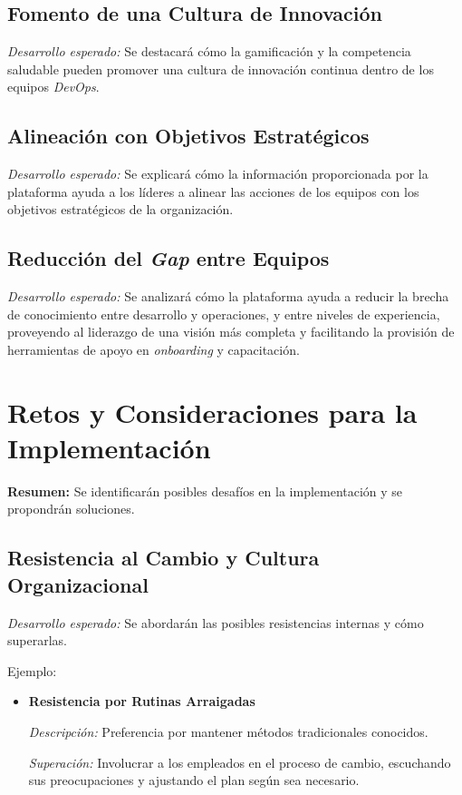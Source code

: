 \documentclass[journal]{IEEEtran}
\begin{document}
\subsection{\textbf{ Fomento de una Cultura de Innovación}}

\textit{Desarrollo esperado:} Se destacará cómo la gamificación y la competencia saludable pueden promover una cultura de innovación continua dentro de los equipos \textit{DevOps}.

\subsection{\textbf{ Alineación con Objetivos Estratégicos}}

\textit{Desarrollo esperado:} Se explicará cómo la información proporcionada por la plataforma ayuda a los líderes a alinear las acciones de los equipos con los objetivos estratégicos de la organización.

\subsection{\textbf{ Reducción del \textit{Gap} entre Equipos}}

\textit{Desarrollo esperado:} Se analizará cómo la plataforma ayuda a reducir la brecha de conocimiento entre desarrollo y operaciones, y entre niveles de experiencia, proveyendo al liderazgo de una visión más completa y facilitando la provisión de herramientas de apoyo en \textit{onboarding} y capacitación.

\section{\textbf{\Large Retos y Consideraciones para la Implementación}}

\textbf{Resumen:} Se identificarán posibles desafíos en la implementación y se propondrán soluciones.

\subsection{\textbf{ Resistencia al Cambio y Cultura Organizacional}}

\textit{Desarrollo esperado:} Se abordarán las posibles resistencias internas y cómo superarlas.

Ejemplo:

\begin{itemize}
    \item \textbf{Resistencia por Rutinas Arraigadas}
    
    \textit{Descripción:} Preferencia por mantener métodos tradicionales conocidos.
    
    \textit{Superación:} Involucrar a los empleados en el proceso de cambio, escuchando sus preocupaciones y ajustando el plan según sea necesario.
\end{itemize}
\end{document}
